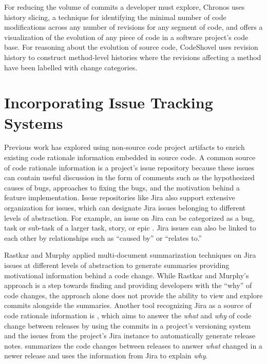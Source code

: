 For reducing the volume of commits a developer must explore, Chronos \cite{servant_history_2012} uses history slicing, 
a technique for identifying the minimal number of code modifications across any number of revisions for any segment of code, 
and offers a visualization of the evolution of any piece of code in a software project's code base.
For reasoning about the evolution of source code, CodeShovel \cite{grund_codeshovel_2021} uses revision history to construct method-level histories where the revisions affecting a method have been labelled with change categories.

\section{Incorporating Issue Tracking Systems}

Previous work has explored using non-source code project artifacts to enrich existing code rationale information embedded in source code. 
A common source of code rationale information is a project's issue repository because these issues can contain useful discussion in the form of comments such as the hypothesized causes of bugs, approaches to fixing the bugs, and the motivation behind a feature implementation. 
Issue repositories like Jira also support extensive organization for issues,
which can designate Jira issues belonging to different levels of abstraction.
For example, an issue on Jira can be categorized as a bug, task or sub-task of a larger task, story, or epic \cite{jira-issue-types}.
Jira issues can also be linked to each other by relationships such as ``caused by'' or ``relates to.''

Rastkar and Murphy \cite{rastkar_why_2013} applied multi-document summarization techniques on Jira issues at different levels of abstraction to generate summaries providing motivational information behind a code change.
While Rastkar and Murphy's approach is a step towards finding and providing developers with the ``why'' of code changes, the approach alone does not provide the ability to view and explore commits alongside the summaries.
Another tool recognizing Jira as a source of code rationale information is  \cite{moreno_arena_2017}, which aims to answer the \emph{what} and \emph{why} of code change between releases by using the commits in a project's versioning system and the issues from the project's Jira instance to automatically generate release notes. 
 summarizes the code changes between releases to answer \emph{what} changed in a newer release and uses the information from Jira to explain \emph{why}.

